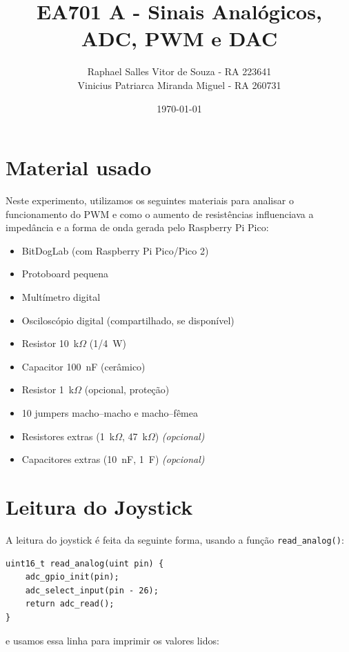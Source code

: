 \documentclass{article}
\title{EA701 A - Sinais Analógicos, ADC, PWM e DAC 
}
\author{
    Raphael Salles Vitor de Souza - RA 223641 \\
    Vinicius Patriarca Miranda Miguel - RA 260731
}
\date{\today}
\begin{document}
\maketitle 


\section*{Material usado}
Neste experimento, utilizamos os seguintes materiais para analisar o funcionamento do PWM e como o aumento de resistências influenciava a impedância e a forma de onda gerada pelo Raspberry Pi Pico:
\begin{multicols}{2}
\begin{itemize}
    \item BitDogLab (com Raspberry Pi Pico/Pico 2)
    \item Protoboard pequena
    \item Multímetro digital
    \item Osciloscópio digital (compartilhado, se disponível)
    \item Resistor 10~k$\Omega$ (1/4~W)
    \item Capacitor 100~nF (cerâmico)
    \item Resistor 1~k$\Omega$ (opcional, proteção)
    \item 10 jumpers macho--macho e macho--fêmea
    \item Resistores extras (1~k$\Omega$, 47~k$\Omega$) \textit{(opcional)}
    \item Capacitores extras (10~nF, 1~\textmu F) \textit{(opcional)}
\end{itemize}
\end{multicols}

\section{Leitura do Joystick}
A leitura do joystick é feita da seguinte forma, usando a função \texttt{read\_analog()}:

\begin{verbatim}
uint16_t read_analog(uint pin) {
    adc_gpio_init(pin); 
    adc_select_input(pin - 26); 
    return adc_read(); 
}
\end{verbatim}  


e usamos essa linha para imprimir os valores lidos:
\end{document}

